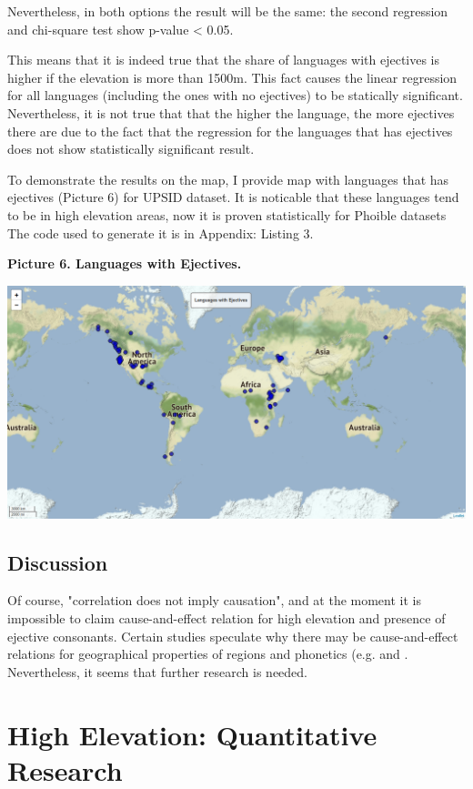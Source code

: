 \documentclass[a4paper,12pt]{article}
\begin{document}
Nevertheless, in both options the result will be the same: the second regression and chi-square test show p-value < 0.05.

This means that it is indeed true that the share of languages with ejectives is higher if the elevation is more than 1500m. This fact causes the linear regression for all languages (including the ones with no ejectives) to be statically significant. Nevertheless, it is not true that that the higher the language, the more ejectives there are due to the fact that the regression for the languages that has ejectives does not show statistically significant result.

To demonstrate the results on the map, I provide map with languages that has ejectives (Picture 6) for UPSID dataset. It is noticable that these languages tend to be in high elevation areas, now it is proven statistically for Phoible datasets The code used to generate it is in Appendix: Listing 3.

\textbf{Picture 6. Languages with Ejectives.}

\includegraphics[width=\textwidth]{images/picture6.png}

\subsection{Discussion}

Of course, "correlation does not imply causation", and at the moment it is impossible to claim cause-and-effect relation for high elevation and presence of ejective consonants. Certain studies speculate why there may be cause-and-effect relations for geographical properties of regions and phonetics (e.g. \parencite{ejectives} and \parencite{climatesSonorants}. Nevertheless, it seems that further research is needed.\

\newpage

\section{High Elevation: Quantitative Research}
\end{document}

